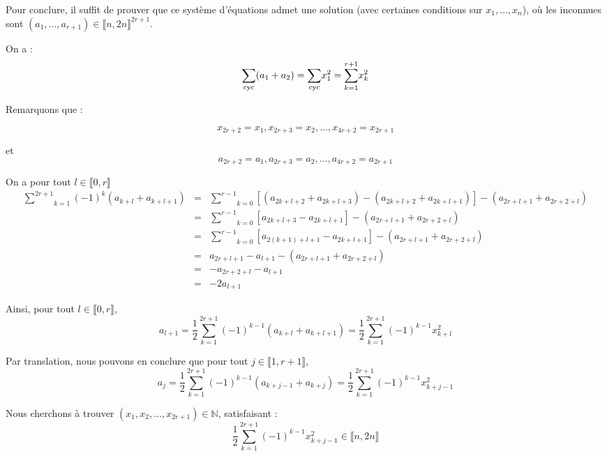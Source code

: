 Pour conclure, il suffit de prouver que ce syst{\`e}me d'{\'e}quations admet
une solution (avec certaines conditions sur $x_1, \ldots, x_n$), o{\`u} les
inconnues sont $(a_1, \ldots, a_{r + 1}) \in \llbracket n, 2 n \rrbracket^{2 r
+ 1}$.

On a :
\[ \underset{\operatorname{cyc}}{\sum} (a_1 + a_2) = \underset{\operatorname{cyc}}{\sum} x^2_1
   = \overset{r + 1}{\underset{k = 1}{\sum}} x^2_k \]


Remarquons que :


\[ x_{2 r + 2} = x_1, x_{2 r + 3} = x_2, \ldots, x_{4 r + 2} = x_{2 r + 1} \]
\text{ }

et
\[ a_{2 r + 2} = a_1, a_{2 r + 3} = a_2, \ldots, a_{4 r + 2} = a_{2 r + 1} \]


On a pour tout $l \in \llbracket 0, r \rrbracket$
\begin{eqnarray*}
  \underset{k = 1}{\overset{2 r + 1}{\sum}} (- 1)^k (a_{k + l} + a_{k + l +
  1}) & = & \underset{k = 0}{\overset{r - 1}{\sum}} [(a_{2 k + l + 2} + a_{2 k
  + l + 3}) - (a_{2 k + l + 2} + a_{2 k + l + 1})] - (a_{2 r + l + 1} + a_{2 r
  + 2 + l})\\
  & = & \underset{k = 0}{\overset{r - 1}{\sum}} [a_{2 k + l + 3} - a_{2 k + l
  + 1}] - (a_{2 r + l + 1} + a_{2 r + 2 + l})\\
  & = & \underset{k = 0}{\overset{r - 1}{\sum}} [a_{2 (k + 1) + l + 1} - a_{2
  k + l + 1}] - (a_{2 r + l + 1} + a_{2 r + 2 + l})\\
  & = & a_{2 r + l + 1} - a_{l + 1} - (a_{2 r + l + 1} + a_{2 r + 2 + l})\\
  & = & - a_{2 r + 2 + l} - a_{l + 1}\\
  & = & - 2 a_{l + 1}
\end{eqnarray*}


Ainsi, pour tout $l \in \llbracket 0, r \rrbracket$,
\[ a_{l + 1} = \frac{1}{2} \underset{k = 1}{\overset{2 r + 1}{\sum}} (- 1)^{k
   - 1} (a_{k + l} + a_{k + l + 1}) = \frac{1}{2} \underset{k = 1}{\overset{2
   r + 1}{\sum}} (- 1)^{k - 1} x^2_{k + l} \]


Par translation, nous pouvons en conclure que pour tout $j \in \llbracket 1, r
+ 1 \rrbracket$,
\[ a_j = \frac{1}{2} \underset{k = 1}{\overset{2 r + 1}{\sum}} (- 1)^{k - 1}
   (a_{k + j - 1} + a_{k + j}) = \frac{1}{2} \underset{k = 1}{\overset{2 r +
   1}{\sum}} (- 1)^{k - 1} x^2_{k + j - 1} \]


Nous cherchons {\`a} trouver $(x_1, x_2, \ldots, x_{2 r + 1}) \in \mathbb{N}$,
satisfaisant :
\[ \frac{1}{2} \underset{k = 1}{\overset{2 r + 1}{\sum}} (- 1)^{k - 1} x^2_{k
   + j - 1} \in \llbracket n, 2 n \rrbracket \]


